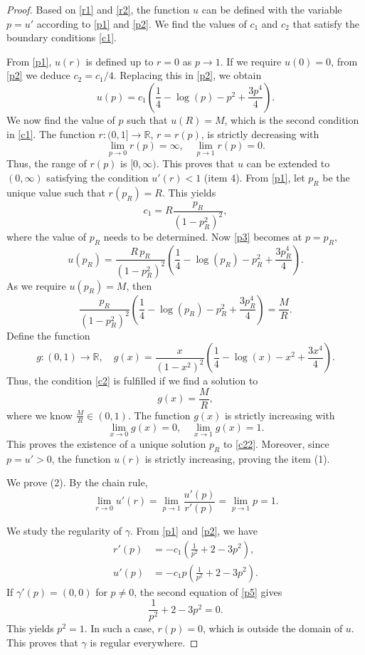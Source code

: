\documentclass[10pt,a4paper]{amsart}
\def\r{\mathbb R}
\begin{document}
\begin{proof}
Based on \eqref{r1} and \eqref{r2}, the function $u$ can be defined with the variable $p=u'$ according to \eqref{p1} and \eqref{p2}. We find the values of $c_1$ and $c_2$ that satisfy the boundary conditions \eqref{c1}. 

From \eqref{p1}, $u(r)$ is defined up to  $r=0$ as $p\to 1$. If we require $u(0)=0$,  from \eqref{p2} we deduce $c_2=c_1/4$. Replacing this in \eqref{p2}, we obtain 
\begin{equation}\label{p3}
u(p)=c_1\left(\frac14-\log(p)-p^2+\frac{3p^4}{4}\right).
\end{equation}
We now find the value of $p$ such that $u(R)=M$, which  is the second condition in \eqref{c1}. The function   $r\colon (0,1]\to\r$, $r=r(p)$, is  strictly decreasing with 
$$\lim_{p\to 0}r(p)=\infty,\quad \lim_{p\to 1}r(p)=0.$$
Thus,   the range of $r(p)$ is $[0,\infty)$. This proves that $u$ can be extended to $(0,\infty)$ satisfying the condition $u'(r)<1$ (item 4). From \eqref{p1}, let $p_R$ be the unique value such that 
$r(p_R)=R$. This yields 
\begin{equation}\label{c111}
c_1=R\frac{p_R}{(1-p_R^2)^2},
\end{equation}
where the value of $p_R$ needs to be determined.  Now \eqref{p3} becomes at $p=p_R$, 
$$u(p_R)=\frac{  R\, p_R}{(1-p_R^2)^2}\left(\frac14-\log(p_R)-p_R^2+\frac{3p_R^4}{4}\right).$$
As we require   $u(p_R)=M$, then  
\begin{equation}\label{c2}
\frac{p_R}{(1-p_R^2)^2}\left(\frac14-\log(p_R)-p_R^2+\frac{3p_R^4}{4}\right)=\frac{M}{R}.
\end{equation}
Define the function  
$$g\colon (0,1)\to\r,\quad g(x)=\frac{x}{(1-x^2)^2}\left(\frac14-\log(x)-x^2+\frac{3x^4}{4}\right).$$
Thus, the condition \eqref{c2} is fulfilled if we find a solution to 
\begin{equation}\label{c22}
g(x)=\frac{M}{R},\end{equation}
where we know $\frac{M}{R}\in (0,1)$.
The function $g(x)$ is strictly increasing with 
$$\lim_{x\to 0}g(x)=0,\quad \lim_{x\to 1}g(x)=1.$$
 This proves the existence of a unique solution  $p_R$ to \eqref{c22}.  Moreover, since $p=u'>0$, the function $u(r)$ is strictly increasing, proving the item (1).

 We prove (2). By the chain rule,  
$$\lim_{r\to 0}u'(r)=\lim_{p\to 1}\frac{u'(p)}{r'(p)}=\lim_{p\to 1}p= 1.$$

 
We study the regularity of $\gamma$. From \eqref{p1} and \eqref{p2}, we have   
\begin{equation}\label{p5}
\begin{split}
r'(p)&=-c_1(\frac{1}{p^2}+2-3p^2),\\
u'(p)&=-c_1p(\frac{1}{p^2}+2-3p^2).
\end{split}
\end{equation}
If   $\gamma'(p)=(0,0)$ for $p\not=0$,   the   second equation of \eqref{p5} gives  
\begin{equation}\label{p4}
\frac{1}{p^2}+2-3p^2=0.
\end{equation}
 This yields $p^2=1$. In such a case, $r(p)=0$, which  is outside the domain of $u$.   This proves that $\gamma$ is regular everywhere.


\end{proof}
\end{document}
